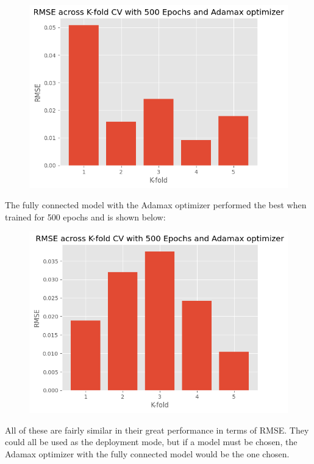 \documentclass[12pt]{article}
\begin{document}
	\begin{figure}[H]
		\includegraphics[scale=0.400]{CV_descending_adamax.png}
		\centering
	\end{figure}


	The fully connected model with the Adamax optimizer performed the best when trained for 500 epochs and is shown below:

	\begin{figure}[H]
		\includegraphics[scale=0.400]{CV_fullconnected_adamax.png}
		\centering
	\end{figure}


	All of these are fairly similar in their great performance in terms of RMSE. They could all be used as the deployment mode, but if a model must be chosen, the Adamax optimizer with the fully connected model would be the one chosen.
\end{document}
